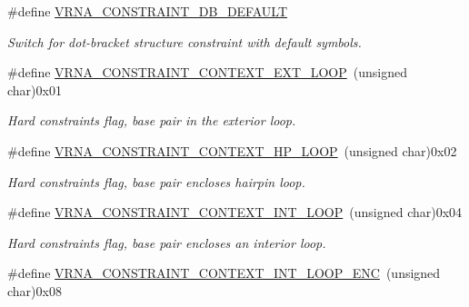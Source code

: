 \begin{DoxyCompactItemize}
\#define \hyperlink{group__hard__constraints_ga1c3864bdc92147a4d93de2b1b4356177}{V\+R\+N\+A\+\_\+\+C\+O\+N\+S\+T\+R\+A\+I\+N\+T\+\_\+\+D\+B\+\_\+\+D\+E\+F\+A\+U\+LT}
\begin{DoxyCompactList}\small\item\em Switch for dot-\/bracket structure constraint with default symbols. \end{DoxyCompactList}\item 
\mbox{\label{group__hard__constraints_ga9418eda62a5dec070896702c279d2548}} 
\#define \hyperlink{group__hard__constraints_ga9418eda62a5dec070896702c279d2548}{V\+R\+N\+A\+\_\+\+C\+O\+N\+S\+T\+R\+A\+I\+N\+T\+\_\+\+C\+O\+N\+T\+E\+X\+T\+\_\+\+E\+X\+T\+\_\+\+L\+O\+OP}~(unsigned char)0x01
\begin{DoxyCompactList}\small\item\em Hard constraints flag, base pair in the exterior loop. \end{DoxyCompactList}\item 
\mbox{\label{group__hard__constraints_ga79203702b197b6b9d3b78eed40663eb1}} 
\#define \hyperlink{group__hard__constraints_ga79203702b197b6b9d3b78eed40663eb1}{V\+R\+N\+A\+\_\+\+C\+O\+N\+S\+T\+R\+A\+I\+N\+T\+\_\+\+C\+O\+N\+T\+E\+X\+T\+\_\+\+H\+P\+\_\+\+L\+O\+OP}~(unsigned char)0x02
\begin{DoxyCompactList}\small\item\em Hard constraints flag, base pair encloses hairpin loop. \end{DoxyCompactList}\item 
\mbox{\label{group__hard__constraints_ga21feeab3a9e5fa5a9e3d9ac0fcf5994f}} 
\#define \hyperlink{group__hard__constraints_ga21feeab3a9e5fa5a9e3d9ac0fcf5994f}{V\+R\+N\+A\+\_\+\+C\+O\+N\+S\+T\+R\+A\+I\+N\+T\+\_\+\+C\+O\+N\+T\+E\+X\+T\+\_\+\+I\+N\+T\+\_\+\+L\+O\+OP}~(unsigned char)0x04
\begin{DoxyCompactList}\small\item\em Hard constraints flag, base pair encloses an interior loop. \end{DoxyCompactList}\item 
\mbox{\label{group__hard__constraints_ga0536288e04ff6332ecdc23ca4705402b}} 
\#define \hyperlink{group__hard__constraints_ga0536288e04ff6332ecdc23ca4705402b}{V\+R\+N\+A\+\_\+\+C\+O\+N\+S\+T\+R\+A\+I\+N\+T\+\_\+\+C\+O\+N\+T\+E\+X\+T\+\_\+\+I\+N\+T\+\_\+\+L\+O\+O\+P\+\_\+\+E\+NC}~(unsigned char)0x08

\end{DoxyCompactItemize}
